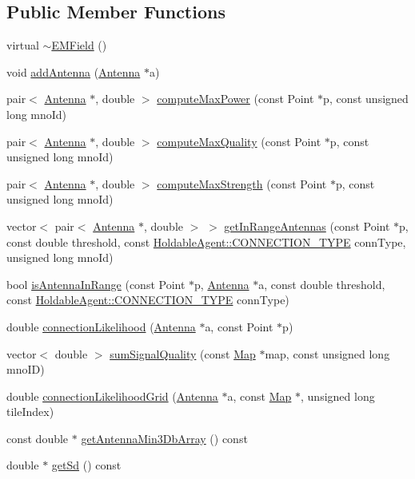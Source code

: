\subsection*{Public Member Functions}
\begin{DoxyCompactItemize}
\item 
virtual \hyperlink{class_e_m_field_abe7db07a27a120858107d5efa5f14edb}{$\sim$\+E\+M\+Field} ()
\item 
void \hyperlink{class_e_m_field_ac531ecbce4c81aa5da19fe3c734a585c}{add\+Antenna} (\hyperlink{class_antenna}{Antenna} $\ast$a)
\item 
pair$<$ \hyperlink{class_antenna}{Antenna} $\ast$, double $>$ \hyperlink{class_e_m_field_a01cfb9fea3dadfcfe5d6f00551193acd}{compute\+Max\+Power} (const Point $\ast$p, const unsigned long mno\+Id)
\item 
pair$<$ \hyperlink{class_antenna}{Antenna} $\ast$, double $>$ \hyperlink{class_e_m_field_ac866f6224e34895a0ee085c4baf43a01}{compute\+Max\+Quality} (const Point $\ast$p, const unsigned long mno\+Id)
\item 
pair$<$ \hyperlink{class_antenna}{Antenna} $\ast$, double $>$ \hyperlink{class_e_m_field_a9a3cdbca4fcf408ce58a30fb98de1bbb}{compute\+Max\+Strength} (const Point $\ast$p, const unsigned long mno\+Id)
\item 
vector$<$ pair$<$ \hyperlink{class_antenna}{Antenna} $\ast$, double $>$ $>$ \hyperlink{class_e_m_field_a2ad800417b06a62e68edd1fccb5c4b93}{get\+In\+Range\+Antennas} (const Point $\ast$p, const double threshold, const \hyperlink{class_holdable_agent_ae2c334b004d7b9c5a999cf2618e4e518}{Holdable\+Agent\+::\+C\+O\+N\+N\+E\+C\+T\+I\+O\+N\+\_\+\+T\+Y\+PE} conn\+Type, unsigned long mno\+Id)
\item 
bool \hyperlink{class_e_m_field_a5cd43aded41779d2d24de3f3e5c717d0}{is\+Antenna\+In\+Range} (const Point $\ast$p, \hyperlink{class_antenna}{Antenna} $\ast$a, const double threshold, const \hyperlink{class_holdable_agent_ae2c334b004d7b9c5a999cf2618e4e518}{Holdable\+Agent\+::\+C\+O\+N\+N\+E\+C\+T\+I\+O\+N\+\_\+\+T\+Y\+PE} conn\+Type)
\item 
double \hyperlink{class_e_m_field_a710da64db53718cdeed7b8c8dc11bba3}{connection\+Likelihood} (\hyperlink{class_antenna}{Antenna} $\ast$a, const Point $\ast$p)
\item 
vector$<$ double $>$ \hyperlink{class_e_m_field_acef16c598b62605a691f75f99d364447}{sum\+Signal\+Quality} (const \hyperlink{class_map}{Map} $\ast$map, const unsigned long mno\+ID)
\item 
double \hyperlink{class_e_m_field_af2d38429adcf17be6e9eb1e8fae6a823}{connection\+Likelihood\+Grid} (\hyperlink{class_antenna}{Antenna} $\ast$a, const \hyperlink{class_map}{Map} $\ast$, unsigned long tile\+Index)
\item 
const double $\ast$ \hyperlink{class_e_m_field_ab2132484b9c52f2224bc81f354b24df6}{get\+Antenna\+Min3\+Db\+Array} () const
\item 
double $\ast$ \hyperlink{class_e_m_field_a0fea003948a67df01174480480376169}{get\+Sd} () const
\end{DoxyCompactItemize}
